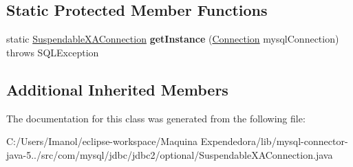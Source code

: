 \subsection*{Static Protected Member Functions}
\begin{DoxyCompactItemize}
\item 
\mbox{\label{classcom_1_1mysql_1_1jdbc_1_1jdbc2_1_1optional_1_1_suspendable_x_a_connection_a5c6a9c58e821f060f5b0e528e3dbfc41}} 
static \mbox{\hyperlink{classcom_1_1mysql_1_1jdbc_1_1jdbc2_1_1optional_1_1_suspendable_x_a_connection}{Suspendable\+X\+A\+Connection}} {\bfseries get\+Instance} (\mbox{\hyperlink{interfacecom_1_1mysql_1_1jdbc_1_1_connection}{Connection}} mysql\+Connection)  throws S\+Q\+L\+Exception 
\end{DoxyCompactItemize}
\subsection*{Additional Inherited Members}


The documentation for this class was generated from the following file\+:\begin{DoxyCompactItemize}
\item 
C\+:/\+Users/\+Imanol/eclipse-\/workspace/\+Maquina Expendedora/lib/mysql-\/connector-\/java-\/5../src/com/mysql/jdbc/jdbc2/optional/Suspendable\+X\+A\+Connection.\+java\end{DoxyCompactItemize}

